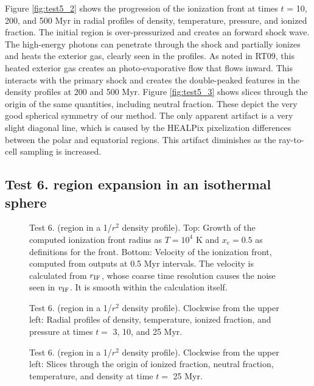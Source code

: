 \documentclass[useAMS,usenatbib]{mn2e}
\begin{document}
Figure \ref{fig:test5_2} shows the progression of the ionization front
at times $t$ = 10, 200, and 500 Myr in radial profiles of density,
temperature, pressure, and ionized fraction.  The initial \hii
region is over-pressurized and creates an forward shock wave.  The
high-energy photons can penetrate through the shock and partially
ionizes and heats the exterior gas, clearly seen in the profiles.  As
noted in RT09, this heated exterior gas creates an photo-evaporative
flow that flows inward.  This interacts with the primary shock and
creates the double-peaked features in the density profiles at 200 and
500 Myr.  Figure \ref{fig:test5_3} shows slices through the origin of
the same quantities, including neutral fraction.  These depict the
very good spherical symmetry of our method.  The only apparent
artifact is a very slight diagonal line, which is caused by the
HEALPix pixelization differences between the polar and equatorial
regions.  This artifact diminishes as the ray-to-cell sampling is
increased.

\subsection{Test 6. \hii region expansion in an isothermal
  sphere}

\begin{figure}
  \caption{\label{fig:test6_1} Test 6. (\hii region in a 1/$r^2$
    density profile).  Top: Growth of the computed ionization front
    radius as $T=10^4$ K and $x_e = 0.5$ as definitions for the front.
    Bottom: Velocity of the ionization front, computed from outputs at
    0.5 Myr intervals.  The velocity is calculated from $r_{\rm IF}$,
    whose coarse time resolution causes the noise seen in $v_{\rm
      IF}$.  It is smooth within the calculation itself.}
\end{figure}

\begin{figure}
  \caption{\label{fig:test6_2} Test 6. (\hii region in a 1/$r^2$
    density profile).  Clockwise from the upper left: Radial profiles of
    density, temperature, ionized fraction, and pressure at times $t
    =$ 3, 10, and 25 Myr.}
\end{figure}

\begin{figure*}
  \caption{\label{fig:test6_3} Test 6. (\hii region in a 1/$r^2$
    density profile).  Clockwise from the upper left: Slices through the origin
    of ionized fraction, neutral fraction, temperature, and density at
    time $t =$ 25 Myr.}
\end{figure*}
\end{document}
